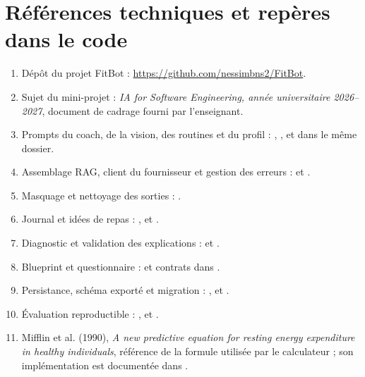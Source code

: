 \documentclass[11pt,a4paper]{article}
\begin{document}
\section*{Références techniques et repères dans le code}
\begin{enumerate}[leftmargin=*,itemsep=0.5em]
\item Dépôt du projet FitBot : \url{https://github.com/nessimbns2/FitBot}.
\item Sujet du mini-projet : \textit{IA for Software Engineering, année universitaire 2026--2027}, document de cadrage fourni par l'enseignant.
\item Prompts du coach, de la vision, des routines et du profil : , ,  et  dans le même dossier.
\item Assemblage RAG, client du fournisseur et gestion des erreurs :  et .
\item Masquage et nettoyage des sorties : .
\item Journal et idées de repas : ,  et .
\item Diagnostic et validation des explications :  et .
\item Blueprint et questionnaire :  et contrats dans .
\item Persistance, schéma exporté et migration : ,  et .
\item Évaluation reproductible : ,  et .
\item Mifflin et al. (1990), \textit{A new predictive equation for resting energy expenditure in healthy individuals}, référence de la formule utilisée par le calculateur ; son implémentation est documentée dans .
\end{enumerate}
\clearpage
\appendix

\end{document}
